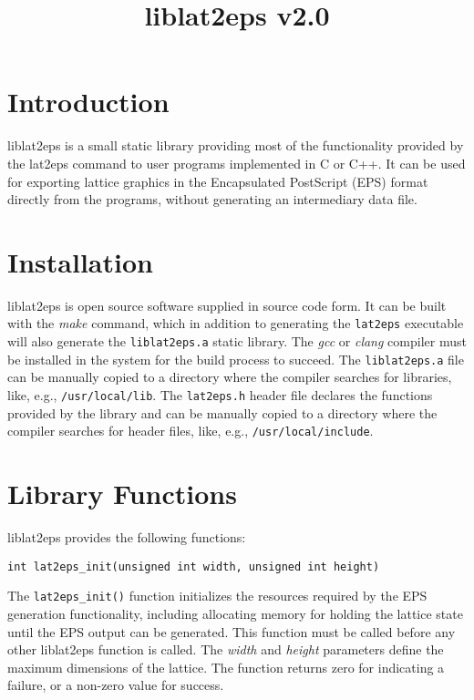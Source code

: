 \documentclass[a4paper]{article}
\title{\vspace{-5ex}liblat2eps v2.0}
\author{}
\date{\vspace{-5ex}}
\begin{document}
\maketitle


\section{Introduction}

liblat2eps is a small static library providing most of the functionality provided by the lat2eps command to user programs implemented in C or C++. It can be used for exporting lattice graphics in the Encapsulated PostScript (EPS) format directly from the programs, without generating an intermediary data file.
\bigbreak

\section{Installation}

liblat2eps is open source software supplied in source code form. It can be built with the \textit{make} command, which in addition to generating the \texttt{lat2eps} executable will also generate the \texttt{liblat2eps.a} static library. The \textit{gcc} or \textit{clang} compiler must be installed in the system for the build process to succeed. The \texttt{liblat2eps.a} file can be manually copied to a directory where the compiler searches for libraries, like, e.g., \texttt{/usr/local/lib}. The \texttt{lat2eps.h} header file declares the functions provided by the library and can be manually copied to a directory where the compiler searches for header files, like, e.g., \texttt{/usr/local/include}.
\bigbreak


\section{Library Functions}

liblat2eps provides the following functions:
\bigbreak\bigbreak

\texttt{int lat2eps\_init(unsigned int width, unsigned int height)}
\bigbreak

The \texttt{lat2eps\_init()} function initializes the resources required by the EPS generation functionality, including allocating memory for holding the lattice state until the EPS output can be generated. This function must be called before any other liblat2eps function is called. The \textit{width} and \textit{height} parameters define the maximum dimensions of the lattice. The function returns zero for indicating a failure, or a non-zero value for success.
\bigbreak\bigbreak
\end{document}

